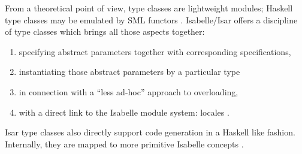 \begin{isabellebody}
\begin{isamarkuptext}
  \noindent From a theoretical point of view, type classes are lightweight
  modules; Haskell type classes may be emulated by
  SML functors \cite{classes_modules}. 
  Isabelle/Isar offers a discipline of type classes which brings
  all those aspects together:

  \begin{enumerate}
    \item specifying abstract parameters together with
       corresponding specifications,
    \item instantiating those abstract parameters by a particular
       type
    \item in connection with a ``less ad-hoc'' approach to overloading,
    \item with a direct link to the Isabelle module system:
      locales \cite{kammueller-locales}.
  \end{enumerate}

  \noindent Isar type classes also directly support code generation
  in a Haskell like fashion. Internally, they are mapped to more primitive 
  Isabelle concepts \cite{Haftmann-Wenzel:2006:classes}.


\end{isamarkuptext}
\end{isabellebody}

